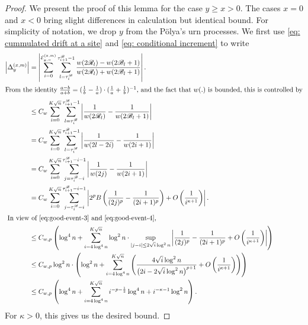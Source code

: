 \documentclass[EJP]{ejpecp} %
\begin{document}
\begin{proof}%
	We present the proof of this lemma for the case $y \ge  x > 0$. The cases $x = 0$ and $x<0$ bring slight differences in calculation but identical bound. For simplicity of notation, we drop $y$ from the P\"olya's urn processes. We first use \eqref{eq: cummulated drift at a site} and \eqref{eq: conditional increment} to write 
	\begin{align*}
		\left| \Delta_y^{(x,m)} \right| 
		&= 
		\left| 	\sum_{i = 0}^{\mathcal{E}_{y,-}^{(x,m)}} 
		\sum_{l = \tau_i^{\mathscr{B}}} ^{\tau_{i+1}^{\mathscr{B}}  -1}
		\frac{w(2 \mathscr{R}_l)- w(2 \mathscr{B}_l + 1)}{w(2 \mathscr{R}_l)+ w(2 \mathscr{B}_l + 1)}
		\right| .\\
		\intertext{From the identity $\frac{a - b}{a + b} = (\frac{1}{b} - \frac{1}{a})\cdot(\frac{1}{a} + \frac{1}{b})^{-1}$, and the fact that $w(.)$ is bounded, this is controlled by}
		&\le C_w \sum_{i = 0}^{K \sqrt{n} } \sum_{l = \tau_i^{\mathscr{B}}} ^{\tau_{i+1}^{\mathscr{B}}  -1}
		\left| \frac{1}{w(2 \mathscr{R}_l)} - \frac{1}{w(2 \mathscr{B}_l + 1)} \right|  \\
		&= C_w \sum_{i = 0}^{K \sqrt{n} } \sum_{l = \tau_i^{\mathscr{B}}} ^{\tau_{i+1}^{\mathscr{B}}  -1}
		\left| \frac{1}{w(2 l - 2 i)} - \frac{1}{w(2i + 1)} \right|  \\
		&= C_w \sum_{i = 0}^{K \sqrt{n} }
		\sum_{j = \tau_i^{\mathscr{B}} - i}^{\tau_{i+1}^{\mathscr{B}} - i - 1} \left| \frac{1}{w(2j)} - \frac{1}{w(2i + 1)} \right|  \\
		&= C_w \sum_{i = 0}^{K \sqrt{n} }
		\sum_{j = \tau_i^{\mathscr{B}} - i}^{\tau_{i+1}^{\mathscr{B}} - i - 1} \left|  2^p B\left( \frac{1}{(2j)^p} - \frac{1}{(2i + 1)^p} \right)  + O\left( \frac{1}{i^{\kappa + 1}} \right) \right|  .\\
		\intertext{
			In view of \eqref{eq:good-event-3} and \eqref{eq:good-event-4},
		}
		&\le C_{w,p} \left(\log^4 n +\sum_{i = 4 \log^4 n}^{K \sqrt{n} } \log^2 n \cdot \sup_{
			|j - i| \le 2 \sqrt{i}  \log^2 n
		} \left|  \frac{1}{(2j)^p} - \frac{1}{(2i + 1)^p} + O\left( \frac{1}{i^{\kappa + 1}} \right) \right|\right)\\
		&\le C_{w, p} \log^2 n \cdot \left( \log^2 n + \sum_{i = 4 \log^4 n}^{K \sqrt{n} } \left( 
		\frac{4 \sqrt{ i } \log^2 n }{\left(2 i - 2 \sqrt{ i } \log^2 n\right)^{p + 1}} 
		+ O\left( \frac{1}{i^{\kappa + 1}} \right)
		\right) \right)  \\
		&\le C_{w, p} \left(\log^4 n + \sum_{i = 4 \log^4 n}^{K \sqrt{n} } i^{- p - \frac{1}{2}} \log^4 n + i^{- \kappa - 1 } \log^2 n \right)
		.\end{align*} 
	For $\kappa>0$, this gives us the desired bound.
\end{proof}
\end{document}

